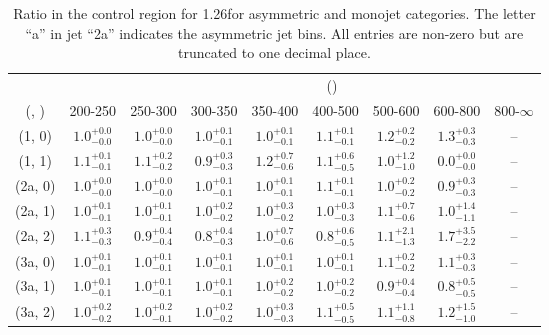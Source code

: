 \begin{table}[h!]
\tiny
\centering
\caption{Ratio in the \mj control region for 1.26\ifb for asymmetric and monojet categories. The letter ``a'' in jet \eg ``2a''  indicates the asymmetric jet bins. All entries are non-zero but are truncated to one decimal place.\label{tab:ratiosep_ewk_mu_asym}}
\begin{tabular}
{ccccccccc}
	\hline\hline
&	& \multicolumn{8}{c}{\scalht (\gev)} \\ 
	 (\njet,  \nb) & 200-250 & 250-300 & 300-350 & 350-400 & 400-500 & 500-600 & 600-800 & 800-$\infty$ \\ [0.8ex] 
\hline
	(1, 0) & $1.0^{+ 0.0 }_{- 0.0 }$ & $1.0^{+ 0.0 }_{- 0.0 }$ & $1.0^{+ 0.1 }_{- 0.1 }$ & $1.0^{+ 0.1 }_{- 0.1 }$ & $1.1^{+ 0.1 }_{- 0.1 }$ & $1.2^{+ 0.2 }_{- 0.2 }$ & $1.3^{+ 0.3 }_{- 0.3 }$ & -- \\[0.5ex] 
	(1, 1) & $1.1^{+ 0.1 }_{- 0.1 }$ & $1.1^{+ 0.2 }_{- 0.2 }$ & $0.9^{+ 0.3 }_{- 0.3 }$ & $1.2^{+ 0.7 }_{- 0.6 }$ & $1.1^{+ 0.6 }_{- 0.5 }$ & $1.0^{+ 1.2 }_{- 1.0 }$ & $0.0^{+ 0.0 }_{- 0.0 }$ & -- \\[0.5ex] 
	(2a, 0) & $1.0^{+ 0.0 }_{- 0.0 }$ & $1.0^{+ 0.0 }_{- 0.0 }$ & $1.0^{+ 0.1 }_{- 0.1 }$ & $1.0^{+ 0.1 }_{- 0.1 }$ & $1.1^{+ 0.1 }_{- 0.1 }$ & $1.0^{+ 0.2 }_{- 0.2 }$ & $0.9^{+ 0.3 }_{- 0.3 }$ & -- \\[0.5ex] 
	(2a, 1) & $1.0^{+ 0.1 }_{- 0.1 }$ & $1.0^{+ 0.1 }_{- 0.1 }$ & $1.0^{+ 0.2 }_{- 0.2 }$ & $1.0^{+ 0.3 }_{- 0.2 }$ & $1.0^{+ 0.3 }_{- 0.3 }$ & $1.1^{+ 0.7 }_{- 0.6 }$ & $1.0^{+ 1.4 }_{- 1.1 }$ & -- \\[0.5ex] 
	(2a, 2) & $1.1^{+ 0.3 }_{- 0.3 }$ & $0.9^{+ 0.4 }_{- 0.4 }$ & $0.8^{+ 0.4 }_{- 0.3 }$ & $1.0^{+ 0.7 }_{- 0.6 }$ & $0.8^{+ 0.6 }_{- 0.5 }$ & $1.1^{+ 2.1 }_{- 1.3 }$ & $1.7^{+ 3.5 }_{- 2.2 }$ & -- \\[0.5ex] 
	(3a, 0) & $1.0^{+ 0.1 }_{- 0.1 }$ & $1.0^{+ 0.1 }_{- 0.1 }$ & $1.0^{+ 0.1 }_{- 0.1 }$ & $1.0^{+ 0.1 }_{- 0.1 }$ & $1.0^{+ 0.1 }_{- 0.1 }$ & $1.1^{+ 0.2 }_{- 0.2 }$ & $1.1^{+ 0.3 }_{- 0.3 }$ & -- \\[0.5ex] 
	(3a, 1) & $1.0^{+ 0.1 }_{- 0.1 }$ & $1.0^{+ 0.1 }_{- 0.1 }$ & $1.0^{+ 0.1 }_{- 0.1 }$ & $1.0^{+ 0.2 }_{- 0.2 }$ & $1.0^{+ 0.2 }_{- 0.2 }$ & $0.9^{+ 0.4 }_{- 0.4 }$ & $0.8^{+ 0.5 }_{- 0.5 }$ & -- \\[0.5ex] 
	(3a, 2) & $1.0^{+ 0.2 }_{- 0.2 }$ & $1.0^{+ 0.2 }_{- 0.1 }$ & $1.0^{+ 0.2 }_{- 0.2 }$ & $1.0^{+ 0.3 }_{- 0.3 }$ & $1.1^{+ 0.5 }_{- 0.5 }$ & $1.1^{+ 1.1 }_{- 0.8 }$ & $1.2^{+ 1.5 }_{- 1.0 }$ & -- \\[0.5ex] 

\end{tabular}
\end{table}
